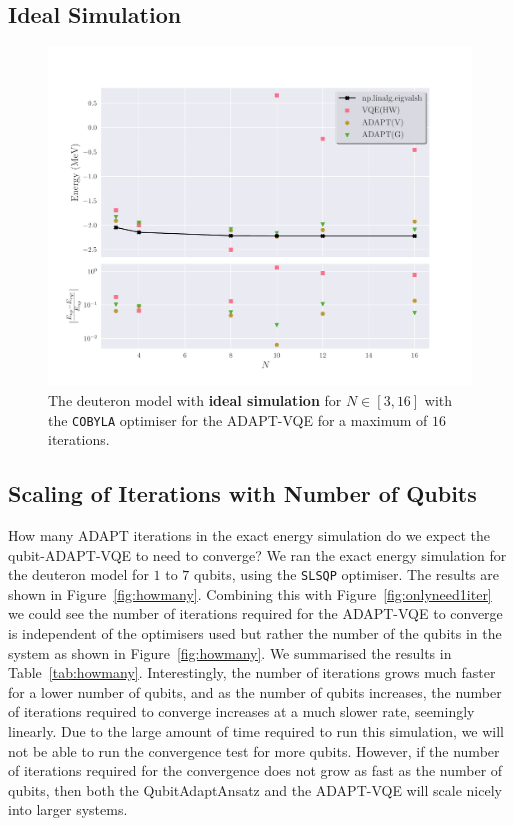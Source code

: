 \subsection{Ideal Simulation}
\begin{figure}[ht]
	\centering
	\includegraphics[width=\linewidth]{image/deuteron_result/main2.pdf}
	\caption{The deuteron model with \textbf{ideal simulation} for $ N \in [3, 16] $ with the \texttt{COBYLA} optimiser for the ADAPT-VQE for a maximum of $ 16 $ iterations.}
	\label{fig:deuteronmain-noisy}
\end{figure}

\subsection{Scaling of Iterations with Number of Qubits}
\label{sub:itervsqubits}

How many ADAPT iterations in the exact energy simulation do we expect the qubit-ADAPT-VQE to need to converge? We ran the exact energy simulation for the deuteron model for $ 1 $ to $ 7 $ qubits, using the \texttt{SLSQP} optimiser. The results are shown in Figure~\ref{fig:howmany}. Combining this with Figure~\ref{fig:onlyneed1iter} we could see the number of iterations required for the ADAPT-VQE to converge is independent of the optimisers used but rather the number of the qubits in the system as shown in Figure~\ref{fig:howmany}. We summarised the results in Table~\ref{tab:howmany}. Interestingly, the number of iterations grows much faster for a lower number of qubits, and as the number of qubits increases, the number of iterations required to converge increases at a much slower rate, seemingly linearly. Due to the large amount of time required to run this simulation, we will not be able to run the convergence test for more qubits. However, if the number of iterations required for the convergence does not grow as fast as the number of qubits, then both the QubitAdaptAnsatz and the ADAPT-VQE will scale nicely into larger systems.


